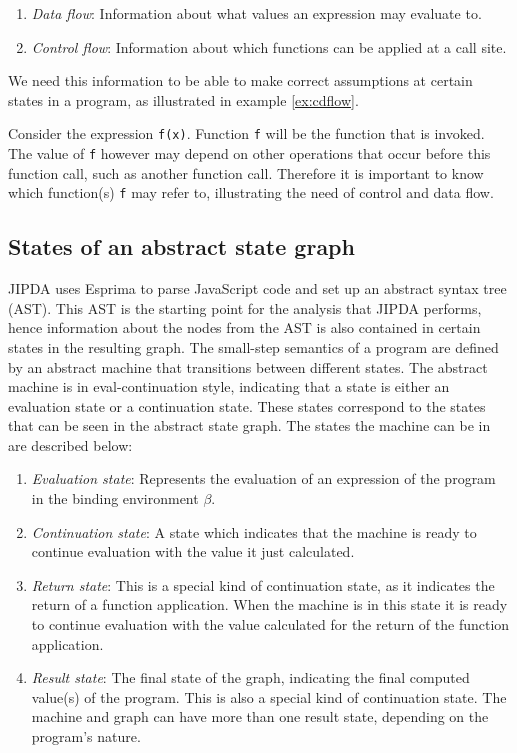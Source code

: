 \begin{enumerate}
\item \textit{Data flow}: Information about what values an expression may evaluate to.
\item \textit{Control flow}: Information about which functions can be applied at a call site.
\end{enumerate}

\noindent We need this information to be able to make correct assumptions at certain states in a program, as illustrated in example \ref{ex:cdflow}. 

\begin{exmp}
\label{ex:cdflow}
Consider the expression \texttt{f(x)}. Function \texttt{f} will be the function that is invoked. The value of \texttt{f} however may depend on other operations that occur before this function call, such as another function call. Therefore it is important to know which function(s) \texttt{f} may refer to, illustrating the need of control and data flow.
\end{exmp}

\subsection{States of an abstract state graph}

JIPDA uses Esprima\cite{Esprima} to parse JavaScript code and set up an abstract syntax tree (AST). This AST is the starting point for the analysis that JIPDA performs, hence information about the nodes from the AST is also contained in certain states in the resulting graph. The small-step semantics of a program are defined by an abstract machine that transitions between different states. The abstract machine is in eval-continuation style, indicating that a state is either an evaluation state or a continuation state. These states correspond to the states that can be seen in the abstract state graph. The states the machine can be in are described below:

\begin{enumerate}
\item \textit{Evaluation state}: Represents the evaluation of an expression of the program in the binding environment $\beta$.
\item \textit{Continuation state}: A state which indicates that the machine is ready to continue evaluation with the value it just calculated.
\item \textit{Return state}: This is a special kind of continuation state, as it indicates the return of a function application. When the machine is in this state it is ready to continue evaluation with the value calculated for the return of the function application.
\item \textit{Result state}: The final state of the graph, indicating the final computed value(s) of the program. This is also a special kind of continuation state. The machine and graph can have more than one result state, depending on the program's nature. 
\end{enumerate}



